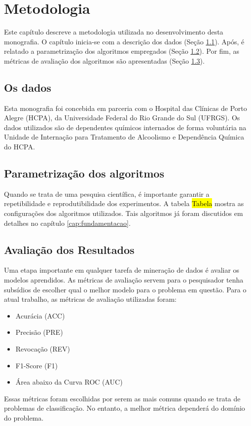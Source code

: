 \chapter{Metodologia}

Este capítulo descreve a metodologia utilizada no desenvolvimento desta monografia. O capítulo inicia-se com a descrição dos dados (Seção \ref{sec:dados}). Após, é relatado a parametrização dos algoritmos empregados (Seção \ref{sec:parametrizacao}). Por fim, as métricas de avaliação dos algoritmos são apresentadas (Seção \ref{sec:metricas_avaliacao}).

\section{Os dados}
\label{sec:dados}
Esta monografia foi concebida em parceria com o Hospital das Clínicas de Porto Alegre (HCPA), da Universidade Federal do Rio Grande do Sul (UFRGS). Os dados utilizados são de dependentes químicos internados de forma voluntária na Unidade de Internação para Tratamento de Alcoolismo e Dependência Química do HCPA. 

\section{Parametrização dos algoritmos}
\label{sec:parametrizacao}
Quando se trata de uma pesquisa científica, é importante garantir a repetibilidade e reprodutibilidade dos experimentos. A tabela \hl{Tabela} mostra as configurações dos algoritmos utilizados. Tais algoritmos já foram discutidos em detalhes no capítulo \ref{cap:fundamentacao}.

\section{Avaliação dos Resultados}
\label{sec:metricas_avaliacao}
Uma etapa importante em qualquer tarefa de mineração de dados é avaliar os modelos aprendidos. As métricas de avaliação servem para o pesquisador tenha subsídios de escolher qual o melhor modelo para o problema em questão. Para o atual trabalho, as métricas de avaliação utilizadas foram:
\begin{itemize}
  \item Acurácia (ACC)
  \item Precisão (PRE)
  \item Revocação (REV)
  \item F1-Score (F1)
  \item Área abaixo da Curva ROC (AUC)
\end{itemize}

Essas métricas foram escolhidas por serem as mais comuns quando se trata de problemas de classificação. No entanto, a melhor métrica dependerá do domínio do problema.